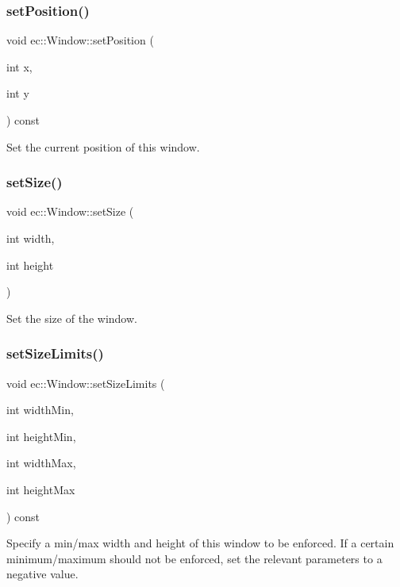 \subsubsection{\texorpdfstring{set\+Position()}{setPosition()}}
{\footnotesize\ttfamily void ec\+::\+Window\+::set\+Position (\begin{DoxyParamCaption}\item[{int}]{x,  }\item[{int}]{y }\end{DoxyParamCaption}) const}

Set the current position of this window. \mbox{\label{classec_1_1_window_af3dce1755c782305930bdc6fb5d4c425}} 
\subsubsection{\texorpdfstring{set\+Size()}{setSize()}}
{\footnotesize\ttfamily void ec\+::\+Window\+::set\+Size (\begin{DoxyParamCaption}\item[{int}]{width,  }\item[{int}]{height }\end{DoxyParamCaption})}

Set the size of the window. \mbox{\label{classec_1_1_window_ab67b420e089268ae3efa76d44a2df9f9}} 
\subsubsection{\texorpdfstring{set\+Size\+Limits()}{setSizeLimits()}}
{\footnotesize\ttfamily void ec\+::\+Window\+::set\+Size\+Limits (\begin{DoxyParamCaption}\item[{int}]{width\+Min,  }\item[{int}]{height\+Min,  }\item[{int}]{width\+Max,  }\item[{int}]{height\+Max }\end{DoxyParamCaption}) const}



Specify a min/max width and height of this window to be enforced. If a certain minimum/maximum should not be enforced, set the relevant parameters to a negative value. 

